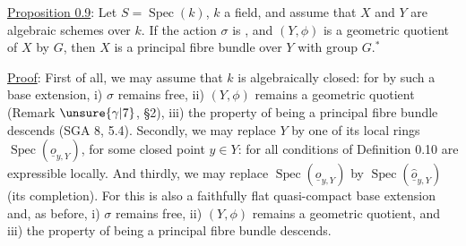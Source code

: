 

\uline{Proposition 0.9}: Let $S=\operatorname{Spec}(k)$, $k$ a field, and assume that
$X$ and $Y$ are algebraic schemes over $k$. If the action $\sigma$ is
,
and $(Y,\phi)$ is a geometric quotient of $X$ by $G$, then $X$ is a principal fibre bundle over $Y$ with group $G$.${}^*$


\uline{Proof}: First of all, we may assume that $k$ is algebraically closed: for by such a base extension, i) $\sigma$ remains free, ii) $(Y,\phi)$ remains a geometric quotient (Remark $\unsure{\gamma|7}$, \S2), iii) the property of being a principal fibre bundle descends (SGA 8, 5.4). Secondly, we may replace $Y$ by one of its local rings $\operatorname{Spec}(\underline{o}_{y,Y})$, for some closed point $y\in Y$: for all conditions of Definition 0.10 are expressible locally. And thirdly, we may replace $\operatorname{Spec}(\underline{o}_{y,Y})$ by $\operatorname{Spec}(\hat{\underline{o}}_{y,Y})$ (its completion). For this is also a faithfully flat quasi-compact base extension and, as before, i) $\sigma$ remains free, ii) $(Y,\phi)$ remains a geometric quotient, and iii) the property of being a principal fibre bundle descends.

